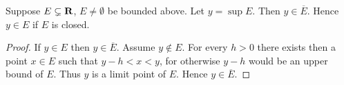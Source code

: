 \begin{proposition}
Suppose $E\subsetneq\mathbf R$, $E\neq\emptyset$ be bounded above. Let $y=\sup E$. Then $y\in\overline{E}$. Hence $y\in E$ if $E$ is closed.
\end{proposition}

\begin{proof}
If $y\in E$ then $y\in\overline{E}$. Assume $y\notin E$. For every $h>0$ there exists then a point $x\in E$ such that $y-h<x<y$, for otherwise $y-h$ would be an upper bound of $E$. Thus $y$ is a limit point of $E$. Hence $y\in\overline{E}$.
\end{proof}
\pagebreak


\begin{comment}
\item A point $x$ is an \vocab{exterior point} of $A$ if it is an interior point of $A^c$.
\item $E$ is compact if it is a bounded closed set.

\begin{proposition}
The set of exterior points, $(A^c)^\circ$ is the same as $(\bar{A})^c$.
\end{proposition}

\begin{proof}
\begin{align*}
x \in (A^c)^\circ 
&\iff \exists \epsilon>0 \text{ such that } B(x,\epsilon) \subset A^c \\
&\iff B(x,\epsilon) \cap A = \emptyset \\
&\iff x \notin A \text{ and } B_0(x,\epsilon) \cap A=\emptyset \\
&\iff x \notin A \cup A^\prime = \bar A \\
&\iff x \in (\bar A^c)
\end{align*}
\end{proof}

\begin{proposition}
\begin{enumerate}[label=(\roman*)]
\item $A^\prime$ is closed.
\item $\bar{A}$ is closed, i.e. $\bar{\bar{A}}=\bar{A}$
\end{enumerate}
\end{proposition}

\begin{proof} \
\begin{enumerate}[label=(\roman*)]
\item In order to show that $A^\prime$ is closed, we need to show that if $x$ is a limit point of $A^\prime$, then $x\in A^\prime$, i.e. $x$ is a limit point of $A$.


\end{comment}

